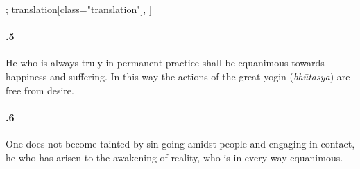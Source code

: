 \begin{alignment}[
  texts=edition[class="edition"];
  translation[class="translation"],
  ]
\begin{translation}
\begin{tlate}
\paragraph{.5} He who is always truly in permanent practice shall be equanimous towards happiness and suffering. In this way the actions of the great yogin (\textit{bhūtasya}) are free from desire.

\paragraph{.6} One does not become tainted by sin going amidst people and engaging in contact, he who has arisen to the awakening of reality, who is in every way equanimous.

    \end{tlate}
  \end{translation}
\end{alignment}
\pagebreak %
